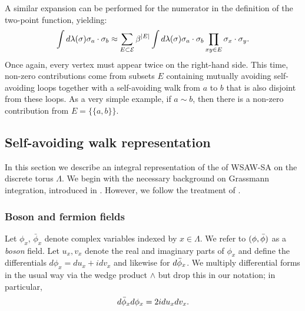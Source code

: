 A similar expansion can be performed for the numerator in the definition of the
two-point function, yielding:
\begin{equation}
\int d\lambda(\sigma) \sigma_a \cdot \sigma_b
	\approx
\sum_{E\subset\mathcal{E}} \beta^{|E|}
\int d\lambda(\sigma) \sigma_a \cdot \sigma_b
\prod_{xy\in E} \sigma_x \cdot \sigma_y.
\end{equation}
Once again, every vertex must appear twice on the right-hand side. This time,
non-zero contributions come from subsets $E$ containing mutually avoiding self-avoiding
loops together with a self-avoiding walk from $a$ to $b$ that is also disjoint from these
loops. As a very simple example, if $a \sim b$, then there is a non-zero contribution from
$E = \{ \{ a, b \} \}$.




\subsection{Self-avoiding walk representation}
\label{sec:intrep}

In this section we describe an integral representation of the of WSAW-SA
on the discrete torus $\Lambda$. We begin with the necessary
background on Grassmann integration, introduced in \cite{Bere66}. However, we
follow the treatment of \cite{BIS09}.

\subsubsection{Boson and fermion fields}
\label{sec:forms}

Let $\phi_x$, $\bar\phi_x$ denote complex variables indexed by $x\in\Lambda$.
We refer to $(\phi, \bar\phi)$ as a \emph{boson} field. Let $u_x, v_x$ denote
the real and imaginary parts of $\phi_x$ and define the differentials
$d\phi_x = du_x + i dv_x$ and likewise for $d\bar\phi_x$.
We multiply differential forms
in the usual way via the wedge product $\wedge$ but drop this in our notation;
in particular,
\begin{equation}
d\bar\phi_x d\phi_x = 2 i du_x dv_x.
\end{equation}

